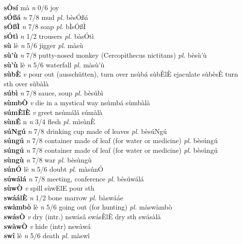 \documentclass{article}
\newlength\cus
\begin{document}
{\bf sÒsí} mà {\it n} 0/6 joy         \\ 
{\bf sÓßá}  {\it n} 7/8 mud {\it pl.} bèsÓßá         \\ 
{\bf sÓßÌ}  {\it n} 7/8 soap {\it pl.} bÌsÓßÌ         \\ 
{\bf sÓtì}  {\it n} 1/2 trousers {\it pl.} bàsÓtì         \\ 
{\bf sù} lè {\it n} 5/6 jigger {\it pl.} màsù         \\ 
{\bf sù'ù}  {\it n} 7/8 putty-nosed monkey (Cercopithecus nictitans) {\it pl.} bèsù'ù         \\ 
{\bf sù'ù} lè {\it n} 5/6 waterfall {\it pl.} màsù'ù         \\ 
{\bf sùbÈ}  {\it v} pour out (ausschütten), turn over   nsùbá sùbÈlÈ ejaculate sùbèsÈ turn sth over sùbàlà   \\ 
{\bf súbì}  {\it n} 7/8 sauce, soup {\it pl.} bèsúbì         \\ 
{\bf sùmbÒ}  {\it v} die in a mystical way   nsùmbá   sùmbàlà   \\ 
{\bf súmÈlÈ}  {\it v} greet   nsúmálâ   súmàlà   \\ 
{\bf sùnÉ} n {\it n} 3/4 flesh {\it pl.} mìsùnÈ         \\ 
{\bf súNgú}  {\it n} 7/8 drinking cup made of leaves {\it pl.} bèsúNgú         \\ 
{\bf súngú}  {\it n} 7/8 container made of leaf (for water or medicine) {\it pl.} bèsúngú         \\ 
{\bf súngú}  {\it n} 7/8 container made of leaf (for water or medicine) {\it pl.} bèsúngú         \\ 
{\bf sùngù}  {\it n} 7/8 war  {\it pl.} bèsùngù         \\ 
{\bf súnÓ} lè {\it n} 5/6 doubt {\it pl.} màsúnÓ         \\ 
{\bf súwálá}  {\it n} 7/8 meeting, conference {\it pl.} bèsúwálá         \\ 
{\bf sùwÒ}  {\it v} spill    sùwElE pour sth     \\ 
{\bf swáálÈ}  {\it n} 1/2 bone marrow {\it pl.} bàswááe         \\ 
{\bf swàmbò} lè {\it n} 5/6 going out (for hunting) {\it pl.} màswàmbò         \\ 
{\bf swásÒ}  {\it v} dry (intr.)   nswásâ swásÈlÈ dry sth  swásàlà   \\ 
{\bf swàwÒ}  {\it v} hide (intr)   nswàwá      \\ 
{\bf swî} lè {\it n} 5/6 death {\it pl.} màswî         \\ 
\end{document}

